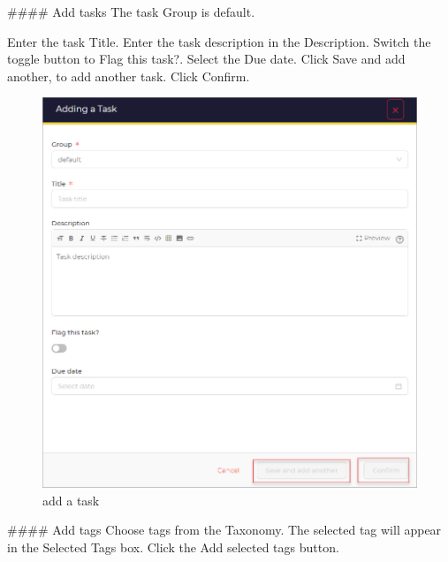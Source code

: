 


\begin{markdown}
#### Add tasks
The task Group is default.

Enter the task Title.
Enter the task description in the Description.
Switch the toggle button to Flag this task?.
Select the Due date.
Click Save and add another, to add another task.
Click Confirm.
\end{markdown}

\begin{figure}[H]
    \centering
    \includegraphics[width=\textwidth]{images/docs/analyst/cases/addition/adding_a_task.png}
    \caption{add a task}
    \label{fig:modules}
\end{figure}

\begin{markdown}

#### Add tags
Choose tags from the Taxonomy. The selected tag will appear in the Selected Tags box.
Click the Add selected tags button.
\end{markdown}



